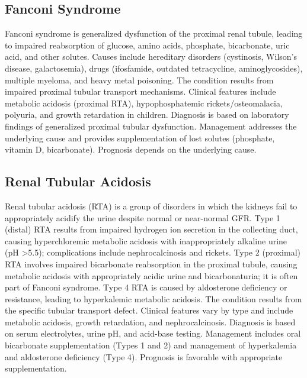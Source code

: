 



\label{sec:Renal Tubular Disorders}

\subsection{Fanconi Syndrome}
\label{sec:Fanconi Syndrome}
Fanconi syndrome is generalized dysfunction of the proximal renal tubule, leading to impaired reabsorption of glucose, amino acids, phosphate, bicarbonate, uric acid, and other solutes. Causes include hereditary disorders (cystinosis, Wilson's disease, galactosemia), drugs (ifosfamide, outdated tetracycline, aminoglycosides), multiple myeloma, and heavy metal poisoning. The condition results from impaired proximal tubular transport mechanisms. Clinical features include metabolic acidosis (proximal RTA), hypophosphatemic rickets/osteomalacia, polyuria, and growth retardation in children. Diagnosis is based on laboratory findings of generalized proximal tubular dysfunction. Management addresses the underlying cause and provides supplementation of lost solutes (phosphate, vitamin D, bicarbonate). Prognosis depends on the underlying cause.

\subsection{Renal Tubular Acidosis}
\label{sec:Renal Tubular Acidosis}
Renal tubular acidosis (RTA) is a group of disorders in which the kidneys fail to appropriately acidify the urine despite normal or near-normal GFR. Type 1 (distal) RTA results from impaired hydrogen ion secretion in the collecting duct, causing hyperchloremic metabolic acidosis with inappropriately alkaline urine (pH >5.5); complications include nephrocalcinosis and rickets. Type 2 (proximal) RTA involves impaired bicarbonate reabsorption in the proximal tubule, causing metabolic acidosis with appropriately acidic urine and bicarbonaturia; it is often part of Fanconi syndrome. Type 4 RTA is caused by aldosterone deficiency or resistance, leading to hyperkalemic metabolic acidosis. The condition results from the specific tubular transport defect. Clinical features vary by type and include metabolic acidosis, growth retardation, and nephrocalcinosis. Diagnosis is based on serum electrolytes, urine pH, and acid-base testing. Management includes oral bicarbonate supplementation (Types 1 and 2) and management of hyperkalemia and aldosterone deficiency (Type 4). Prognosis is favorable with appropriate supplementation.

